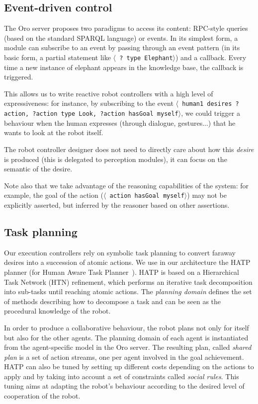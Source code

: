 \documentclass[letterpaper, 10 pt, conference]{ieeeconf}  %
\newcommand{\stmt}[1]{{\footnotesize \tt $\langle$ #1\relax$\rangle$}}
\begin{document}
\subsection{Event-driven control}

The {\sc Oro} server proposes two paradigms to access its content: RPC-style
queries (based on the standard SPARQL language) or events. In its simplest
form, a module can subscribe to an event by passing through an event pattern
(in its basic form, a partial statement like \stmt{? type Elephant}) and a
callback.  Every time a new instance of elephant appears in the knowledge base,
the callback is triggered.

This allows us to write reactive robot controllers with a high level of
expressiveness: for instance, by subscribing to the event \stmt{human1 desires
?action, ?action type Look, ?action hasGoal myself}, we could trigger a
behaviour when the human expresses (through dialogue, gestures...) that he
wants to look at the robot itself.

The robot controller designer does not need to directly care about how this
\emph{desire} is produced (this is delegated to perception modules), it can
focus on the semantic of the desire.

Note also that we take advantage of the reasoning capabilities of the system:
for example, the goal of the action (\stmt{action hasGoal myself}) may not be
explicitly asserted, but inferred by the reasoner based on other assertions.

\subsection{Task planning}

Our execution controllers rely on symbolic task planning to convert faraway
desires into a succession of atomic actions. We use in our architecture the
HATP planner (for Human Aware Task Planner~\cite{Alili2009}).  HATP is based on
a Hierarchical Task Network (HTN) refinement, which performs an iterative task
decomposition into sub-tasks until reaching atomic actions.  The \emph{planning
domain} defines the set of methods describing how to decompose a task and can
be seen as the procedural knowledge of the robot.

In order to produce a collaborative behaviour, the robot plans not only for
itself but also for the other agents. The planning domain of each agent is
instantiated from the agent-specific model in the {\sc Oro} server. The resulting
plan, called \emph{shared plan} is a set of action streams, one per
agent involved in the goal achievement. HATP can also be tuned by setting up
different costs depending on the actions to apply and by taking into account a
set of constraints called \emph{social rules}. This tuning aims at adapting the
robot's behaviour according to the desired level of cooperation of the robot.
\end{document}
